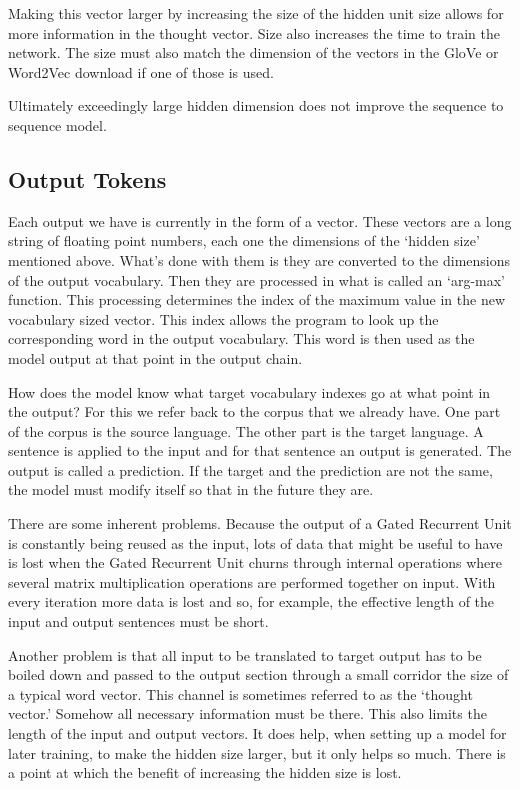 Making this vector larger by increasing the size of the hidden unit size allows for more information in the thought vector. Size also increases the time to train the network. The size must also match the dimension of the vectors in the GloVe or Word2Vec download if
one of those is used. 

Ultimately exceedingly large hidden dimension does not improve the sequence to sequence model.

\subsection*{Output Tokens}
Each output we have is currently in the form of a vector. These vectors are a long string of floating point numbers, each one the dimensions of the `hidden size' mentioned above. What's done with them is they are converted to the dimensions of the output vocabulary. Then they are processed in what is called an `arg-max' function. This processing determines the index of the maximum value in the new vocabulary sized vector. This index allows the program to look up the corresponding word in the output vocabulary. This word is then used as the model output at that point in the output chain.

How does the model know what target vocabulary indexes go at what point in the output? For this we refer back to the corpus that we already have. One part of the corpus is the source language. The other part is the target language. A sentence is applied to the input and for that sentence an output is generated. The output is called a prediction. If the target and the prediction are not the same, the model must modify itself so that in the future they are.

There are some inherent problems. Because the output of a Gated Recurrent Unit is constantly being reused as the input, lots of data that might be useful to have is lost when the Gated Recurrent Unit churns through internal operations where several matrix multiplication operations are performed together on input. With every iteration more data is lost and so, for example, the effective length of the input and output sentences must be short. 

Another problem is that all input to be translated to target output has to be boiled down and passed to the output section through a small corridor the size of a typical word vector. This channel is sometimes referred to as the `thought vector.' Somehow all necessary information must be there. This also limits the length of the input and output vectors. It does help, when setting up a model for later training, to make the hidden size larger, but it only helps so much. There is a point at which the benefit of increasing the hidden size is lost.

